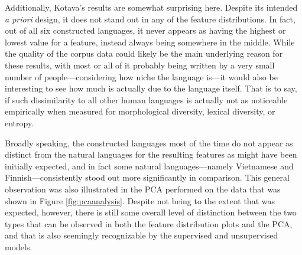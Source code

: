 \documentclass[12pt,a4paper]{article}
\numberwithin{figure}{section}
\numberwithin{table}{section}
\numberwithin{definition}{section}
\begin{document}


Additionally, Kotava's results are somewhat surprising here. Despite its intended \textit{a priori} design, it does not stand out in any of the feature distributions. In fact, out of all six constructed languages, it never appears as having the highest or lowest value for a feature, instead always being somewhere in the middle. While the quality of the corpus data could likely be the main underlying reason for these results, with most or all of it probably being written by a very small number of people---considering how niche the language is---it would also be interesting to see how much is actually due to the language itself. That is to say, if such dissimilarity to all other human languages is actually not as noticeable empirically when measured for morphological diversity, lexical diversity, or entropy.

Broadly speaking, the constructed languages most of the time do not appear as distinct from the natural languages for the resulting features as might have been initially expected, and in fact some natural languages---namely Vietnamese and Finnish---consistently stood out more significantly in comparison. This general observation was also illustrated in the PCA performed on the data that was shown in Figure \ref{fig:pcaanalysis}. Despite not being to the extent that was expected, however, there is still some overall level of distinction between the two types that can be observed in both the feature distribution plots and the PCA, and that is also seemingly recognizable by the supervised and unsupervised models. 




\end{document}
